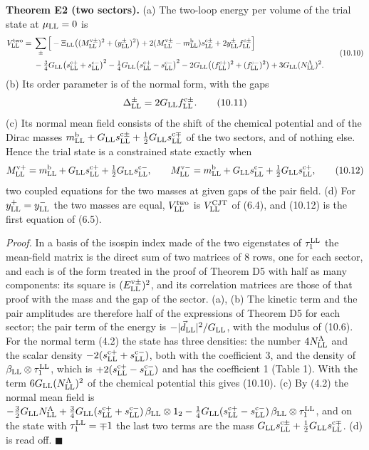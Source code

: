 \documentclass[
  10pt,
]{article}
\begin{document}
\textbf{Theorem E2 (two sectors).} (a) The two-loop energy per volume of
the trial state at \(\mu_{\rm LL}=0\) is
\[\begin{aligned}V^{\rm two}_{\rm LL}={}&\sum_\pm\Big[-\Xi_{\rm LL}\big((M^{{\rm v}\pm}_{\rm LL})^2+(y^\pm_{\rm LL})^2\big)+2(M^{{\rm v}\pm}_{\rm LL}-m^{\rm b}_{\rm LL})s^{{\rm c}\pm}_{\rm LL}+2y^\pm_{\rm LL}f^{{\rm c}\pm}_{\rm LL}\Big]\\
&-\tfrac34G_{\rm LL}\big(s^{{\rm c}+}_{\rm LL}+s^{{\rm c}-}_{\rm LL}\big)^2-\tfrac14G_{\rm LL}\big(s^{{\rm c}+}_{\rm LL}-s^{{\rm c}-}_{\rm LL}\big)^2
-2G_{\rm LL}\big((f^{{\rm c}+}_{\rm LL})^2+(f^{{\rm c}-}_{\rm LL})^2\big)+3G_{\rm LL}(N^\Lambda_{\rm LL})^2.\end{aligned}\tag{10.10}\]
(b) Its order parameter is of the normal form, with the gaps
\[\Delta^\pm_{\rm LL}=2G_{\rm LL}f^{{\rm c}\pm}_{\rm LL}.\tag{10.11}\]
(c) Its normal mean field consists of the shift of the chemical
potential and of the Dirac masses
\(m^{\rm b}_{\rm LL}+G_{\rm LL}s^{{\rm c}\pm}_{\rm LL}+\tfrac12G_{\rm LL}s^{{\rm c}\mp}_{\rm LL}\)
of the two sectors, and of nothing else. Hence the trial state is a
constrained state exactly when
\[M^{{\rm v}+}_{\rm LL}=m^{\rm b}_{\rm LL}+G_{\rm LL}s^{{\rm c}+}_{\rm LL}+\tfrac12G_{\rm LL}s^{{\rm c}-}_{\rm LL},\qquad
M^{{\rm v}-}_{\rm LL}=m^{\rm b}_{\rm LL}+G_{\rm LL}s^{{\rm c}-}_{\rm LL}+\tfrac12G_{\rm LL}s^{{\rm c}+}_{\rm LL},\tag{10.12}\]
two coupled equations for the two masses at given gaps of the pair
field. (d) For \(y^+_{\rm LL}=y^-_{\rm LL}\) the two masses are equal,
\(V^{\rm two}_{\rm LL}\) is \(V^{\rm CJT}_{\rm LL}\) of (6.4), and
(10.12) is the first equation of (6.5).

\emph{Proof.} In a basis of the isospin index made of the two
eigenstates of \(\tau^{\rm LL}_1\) the mean-field matrix is the direct
sum of two matrices of 8 rows, one for each sector, and each is of the
form treated in the proof of Theorem D5 with half as many components:
its square is \((E^{{\rm v}\pm}_{\rm LL})^2\), and its correlation
matrices are those of that proof with the mass and the gap of the
sector. (a), (b) The kinetic term and the pair amplitudes are therefore
half of the expressions of Theorem D5 for each sector; the pair term of
the energy is \(-\lvert\vec d_{\rm LL}\rvert^2/G_{\rm LL}\), with the
modulus of (10.6). For the normal term (4.2) the state has three
densities: the number \(4N^\Lambda_{\rm LL}\) and the scalar density
\(-2(s^{{\rm c}+}_{\rm LL}+s^{{\rm c}-}_{\rm LL})\), both with the
coefficient 3, and the density of
\(\beta_{\rm LL}\otimes\tau^{\rm LL}_1\), which is
\(+2(s^{{\rm c}+}_{\rm LL}-s^{{\rm c}-}_{\rm LL})\) and has the
coefficient 1 (Table 1). With the term
\(6G_{\rm LL}(N^\Lambda_{\rm LL})^2\) of the chemical potential this
gives (10.10). (c) By (4.2) the normal mean field is
\(-\tfrac32G_{\rm LL}N^\Lambda_{\rm LL} +\tfrac34G_{\rm LL}(s^{{\rm c}+}_{\rm LL}+s^{{\rm c}-}_{\rm LL})\,\beta_{\rm LL}\otimes\mathsf 1_2 -\tfrac14G_{\rm LL}(s^{{\rm c}+}_{\rm LL}-s^{{\rm c}-}_{\rm LL})\,\beta_{\rm LL}\otimes\tau^{\rm LL}_1\),
and on the state with \(\tau^{\rm LL}_1=\mp1\) the last two terms are
the mass
\(G_{\rm LL}s^{{\rm c}\pm}_{\rm LL}+\tfrac12G_{\rm LL}s^{{\rm c}\mp}_{\rm LL}\).
(d) is read off. \(\blacksquare\)
\end{document}
